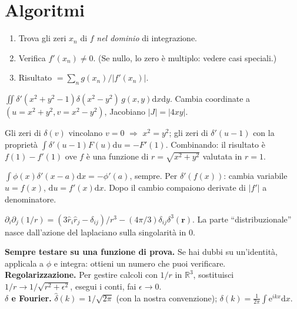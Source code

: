 \documentclass[11pt,a4paper,openany]{book}
\theoremstyle{definition}
\newcommand{\R}{\mathbb{R}}
\newcommand{\dd}{\mathrm{d}}
\newcommand{\eu}{\mathrm{e}}
\begin{document}
\section{Algoritmi}

\begin{algoritmo}[$\int g(x)\delta(f(x))\dd x$]
\begin{enumerate}
\item Trova gli zeri $x_n$ di $f$ \emph{nel dominio} di integrazione.
\item Verifica $f'(x_n)\neq 0$. (Se nullo, lo zero \`e multiplo: vedere casi speciali.)
\item Risultato $=\sum_n g(x_n)/|f'(x_n)|$.
\end{enumerate}
\end{algoritmo}

\begin{esempio}[Scritto 20/01/2026, Es. 3]
$\iint\delta'(x^2+y^2-1)\delta(x^2-y^2)\,g(x,y)\dd x\dd y$. Cambia coordinate a $(u=x^2+y^2,v=x^2-y^2)$, Jacobiano $|J|=|4xy|$.

Gli zeri di $\delta(v)$ vincolano $v=0$ $\Rightarrow$ $x^2=y^2$; gli zeri di $\delta'(u-1)$ con la propriet\`a $\int\delta'(u-1)F(u)\dd u=-F'(1)$. Combinando: il risultato \`e $f(1)-f'(1)$ ove $f$ \`e una funzione di $r=\sqrt{x^2+y^2}$ valutata in $r=1$.
\end{esempio}

\begin{algoritmo}
$\int\phi(x)\delta'(x-a)\dd x=-\phi'(a)$, sempre.
Per $\delta'(f(x))$: cambia variabile $u=f(x)$, $\dd u=f'(x)\dd x$. Dopo il cambio compaiono derivate di $|f'|$ a denominatore.
\end{algoritmo}

\begin{esempio}
$\partial_i\partial_j(1/r)=(3\hat r_i\hat r_j-\delta_{ij})/r^3-(4\pi/3)\delta_{ij}\delta^3(\bm r)$. La parte ``distribuzionale'' nasce dall'azione del laplaciano sulla singolarit\`a in $0$.
\end{esempio}

\begin{trucco}
\textbf{Sempre testare su una funzione di prova.} Se hai dubbi su un'identit\`a, applicala a $\phi$ e integra: ottieni un numero che puoi verificare.\\
\textbf{Regolarizzazione.} Per gestire calcoli con $1/r$ in $\R^3$, sostituisci $1/r\to 1/\sqrt{r^2+\epsilon^2}$, esegui i conti, fai $\epsilon\to 0$.\\
\textbf{$\delta$ e Fourier.} $\hat\delta(k)=1/\sqrt{2\pi}$ (con la nostra convenzione); $\delta(k)=\frac{1}{2\pi}\int\eu^{ikx}\dd x$.
\end{trucco}
\end{document}
